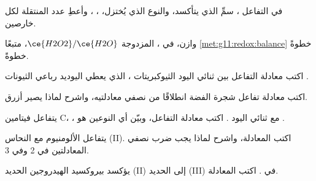 \begin{exercise}[$\star$]\label{exo:g11:redox:5}
في التفاعل ، سمِّ 
الذي يتأكسد، والنوع الذي يُختزل، ، ، وأعطِ
عدد  المنتقلة لكل  خارصين.
\end{exercise}

\begin{exercise}[$\star\star$]\label{exo:g11:redox:6}
وازن، في ،  المزدوجة
$\ce{H2O2}/\ce{H2O}$، متبعًا \cref{met:g11:redox:balance} خطوةً
خطوةً.
\end{exercise}

\begin{exercise}[$\star\star$]\label{exo:g11:redox:7}
اكتب معادلة التفاعل بين ثنائي اليود  
الثيوكبريتات ، الذي يعطي  اليوديد 
رباعي الثيونات .
\end{exercise}

\begin{exercise}[$\star\star$]\label{exo:g11:redox:8}
اكتب معادلة تفاعل شجرة الفضة انطلاقًا من نصفي
معادلتيه، واشرح لماذا يصير  أزرق.
\end{exercise}

\begin{exercise}[$\star\star$]\label{exo:g11:redox:9}
يتفاعل فيتامين C، ، مع ثنائي اليود . اكتب معادلة
التفاعل، وبيّن أي النوعين هو .
\end{exercise}

\begin{exercise}[$\star\star$]\label{exo:g11:redox:10}
يتفاعل الألومنيوم مع  النحاس (II). اكتب المعادلة، واشرح
لماذا يجب ضرب نصفي المعادلتين في 2 وفي 3.
\end{exercise}

\begin{exercise}[$\star\star$]\label{exo:g11:redox:11}
يؤكسد بيروكسيد الهيدروجين  الحديد (II) إلى  الحديد (III) في . اكتب المعادلة.
\end{exercise}

